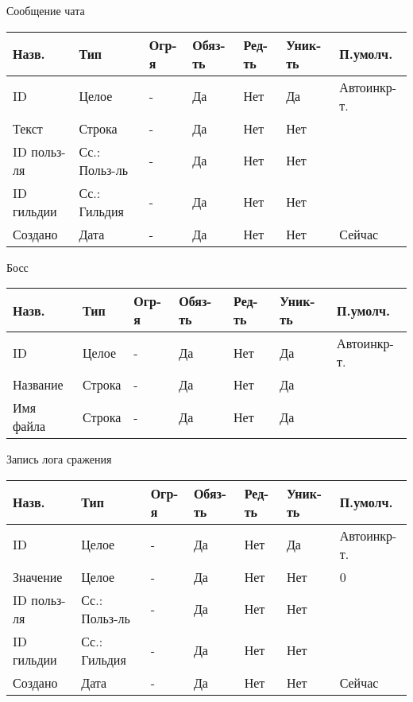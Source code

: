 \documentclass[../document.tex]{subfiles}
\begin{document}
Сообщение чата

\begin{tabular}{ | l | l | l | l | l | l | l | }
  \hline
  Назв.       & Тип           & Огр-я & Обяз-ть & Ред-ть & Уник-ть & П.умолч.    \\
  \hline
  ID          & Целое         & -     & Да      & Нет    & Да      & Автоинкр-т. \\
  Текст       & Строка        & -     & Да      & Нет    & Нет     &             \\
  ID польз-ля & Сс.: Польз-ль & -     & Да      & Нет    & Нет     &             \\
  ID гильдии  & Сс.: Гильдия  & -     & Да      & Нет    & Нет     &             \\
  Создано     & Дата          & -     & Да      & Нет    & Нет     & Сейчас      \\
  \hline
\end{tabular}

Босс

\begin{tabular}{ | l | l | l | l | l | l | l | }
  \hline
  Назв.     & Тип    & Огр-я & Обяз-ть & Ред-ть & Уник-ть & П.умолч.    \\
  \hline
  ID        & Целое  & -     & Да      & Нет    & Да      & Автоинкр-т. \\
  Название  & Строка & -     & Да      & Нет    & Да      &             \\
  Имя файла & Строка & -     & Да      & Нет    & Да      &             \\
  \hline
\end{tabular}

Запись лога сражения

\begin{tabular}{ | l | l | l | l | l | l | l | }
  \hline
  Назв.       & Тип           & Огр-я & Обяз-ть & Ред-ть & Уник-ть & П.умолч.    \\
  \hline
  ID          & Целое         & -     & Да      & Нет    & Да      & Автоинкр-т. \\
  Значение    & Целое         & -     & Да      & Нет    & Нет     & 0           \\
  ID польз-ля & Сс.: Польз-ль & -     & Да      & Нет    & Нет     &             \\
  ID гильдии  & Сс.: Гильдия  & -     & Да      & Нет    & Нет     &             \\
  Создано     & Дата          & -     & Да      & Нет    & Нет     & Сейчас      \\
  \hline
\end{tabular}
\end{document}
